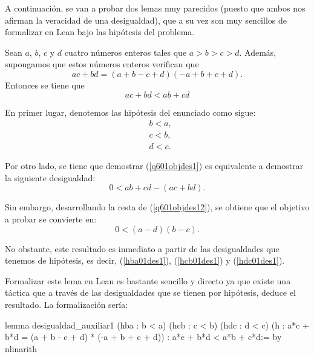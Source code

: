 A continuación, se van a probar dos lemas muy parecidos (puesto que
ambos nos afirman la veracidad de una desigualdad), que a su vez son muy
sencillos de formalizar en Lean bajo las hipótesis del problema.

\begin{lema}\label{lemades1}
  Sean \(a\), \(b\), \(c\) y \(d\) cuatro números enteros tales que
  \(a > b > c > d \). Además, supongamos que
  estos números enteros verifican que
    \begin{equation}\tag{h}
      ac+bd = (a+b-c+d)(-a+b+c+d).
    \end{equation}
    Entonces se tiene que
    \begin{equation}\label{q601objdes1}
      ac+bd < ab+cd
    \end{equation}
\end{lema}

\begin{demostracion}
    En primer lugar, denotemos las hipótesis del enunciado como sigue:
  \begin{align}
    &b<a,\tag{hba}\label{hba01des1}\\
    &c<b,\tag{hcb}\label{hcb01des1}\\
    &d<c.\tag{hdc}\label{hdc01des1}
  \end{align}

  Por otro lado, se tiene que demostrar (\ref{q601objdes1}) es equivalente
  a demostrar la siguiente desigualdad:
  \begin{equation}\label{q601objdes12}
      0<ab+cd-(ac+bd).
  \end{equation}

  Sin embargo, desarrollando la resta de (\ref{q601objdes12}), se obtiene
  que el objetivo a probar se convierte en:
  \begin{equation}\label{q601objdes13}
      0<(a-d)(b-c).
  \end{equation}

  No obstante, este resultado es inmediato a partir de las desigualdades
  que tenemos de hipótesis, es decir, (\ref{hba01des1}), (\ref{hcb01des1})
  y (\ref{hdc01des1}).
\end{demostracion}

Formalizar este lema en Lean es bastante sencillo y directo ya que
existe una táctica que a través de las desigualdades que se tienen por
hipótesis, deduce el resultado. La formalización sería:
\begin{leancode}
lemma desigualdad_auxiliar1
  (hba : b < a)
  (hcb : c < b)
  (hdc : d < c)
  (h : a*c + b*d = (a + b - c + d) * (-a + b + c + d))
  : a*c + b*d < a*b + c*d:=
by nlinarith
\end{leancode}

